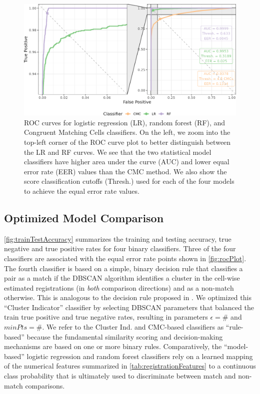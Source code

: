 \documentclass[reprint]{JASA}
\begin{document}
\begin{figure}[htbp]

{\centering \includegraphics[width=\textwidth]{images/resultsPlots/rocPlot} 

}

\caption{ROC curves for logistic regression (LR), random forest (RF), and Congruent Matching Cells classifiers. On the left, we zoom into the top-left corner of the ROC curve plot to better distinguish between the LR and RF curves. We see that the two statistical model classifiers have higher area under the curve (AUC) and lower equal error rate (EER) values than the CMC method. We also show the score classification cutoffs (Thresh.) used for each of the four models to achieve the equal error rate values.}\label{fig:rocPlot}
\end{figure}

\hypertarget{optimized-model-comparison}{%
\subsection{Optimized Model
Comparison}\label{optimized-model-comparison}}

\autoref{fig:trainTestAccuracy} summarizes the training and testing
accuracy, true negative and true positive rates for four binary
classifiers. Three of the four classifiers are associated with the equal
error rate points shown in \autoref{fig:rocPlot}. The fourth classifier
is based on a simple, binary decision rule that classifies a pair as a
match if the DBSCAN algorithm identifies a cluster in the cell-wise
estimated registrations (in \emph{both} comparison directions) and as a
non-match otherwise. This is analogous to the decision rule proposed in
\citet{zhang_convergence_2021}. We optimized this ``Cluster Indicator''
classifier by selecting DBSCAN parameters that balanced the train true
positive and true negative rates, resulting in parameters
\(\epsilon = \#\) and \(minPts = \#\). We refer to the Cluster Ind. and
CMC-based classifiers as ``rule-based'' because the fundamental
similarity scoring and decision-making mechanisms are based on one or
more binary rules. Comparatively, the ``model-based'' logistic
regression and random forest classifiers rely on a learned mapping of
the numerical features summarized in \autoref{tab:registrationFeatures}
to a continuous class probability that is ultimately used to
discriminate between match and non-match comparisons.
\end{document}
